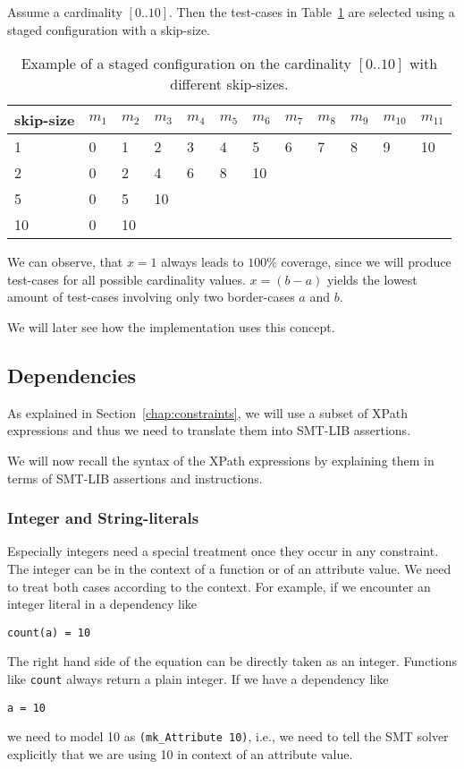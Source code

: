 \begin{example}
Assume a cardinality $[0..10]$. Then the test-cases in Table~\ref{tab:exTc} are selected using a staged configuration with a skip-size. 
\begin{table}[h]
\centering
\begin{tabular}{l|l|l|l|l|l|l|l|l|l|l|l}
\textbf{skip-size} & $m_1$ & $m_2$ & $m_3$ & $m_4$ & $m_5$ & $m_6$ & $m_7$ & $m_8$ & $m_9$ & $m_{10}$ & $m_{11}$\\ \hline
1 & 0 & 1 & 2 & 3 & 4 & 5 & 6 & 7 & 8 & 9 & 10 \\ \hline
2 & 0 & 2 & 4 & 6 & 8 & 10 & & & & & \\ \hline
5 & 0 & 5 & 10 & & & & & & & & \\ \hline
10 & 0 & 10 & & & & & & & & &
\end{tabular}
\caption[Staged Configuration Example]{Example of a staged configuration on the cardinality $[0..10]$ with different skip-sizes.}\label{tab:exTc}
\end{table} 
We can observe, that $x = 1$ always leads to $100 \%$ coverage, since we will produce test-cases for all possible cardinality values. $x = (b-a)$ yields the lowest amount of test-cases involving only two border-cases $a$ and $b$.
\end{example}

We will later see how the implementation uses this concept.


\subsection{Dependencies}\label{sec:mconstraints}

As explained in Section~\ref{chap:constraints}, we will use a subset of XPath expressions and thus we need to translate them into SMT-LIB assertions. 

We will now recall the syntax of the XPath expressions by explaining them in terms of SMT-LIB assertions and instructions.

\subsubsection*{Integer and String-literals}

Especially integers need a special treatment once they occur in any constraint. The integer can be in the context of a function or of an attribute value. We need to treat both cases according to the context. For example, if we encounter an integer literal in a dependency like
\begin{verbatim}
count(a) = 10
\end{verbatim}
The right hand side of the equation can be directly taken as an integer. Functions like \verb|count| always return a plain integer. If we have a dependency like 
\begin{verbatim}
a = 10
\end{verbatim}
we need to model 10 as \verb|(mk_Attribute 10)|, i.e., we need to tell the SMT solver explicitly that we are using 10 in context of an attribute value.
 
